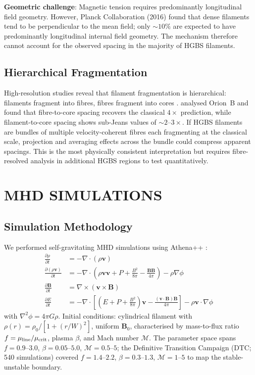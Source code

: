 \documentclass[twoside,twocolumn]{mnras}
\begin{document}
\textbf{Geometric challenge}: Magnetic tension requires predominantly longitudinal field
geometry. However, Planck Collaboration (2016) found that dense filaments tend to be
perpendicular to the mean field; only ${\sim}10\%$ are expected to have predominantly
longitudinal internal field geometry. The mechanism therefore cannot account for the
observed spacing in the majority of HGBS filaments.

\subsection{Hierarchical Fragmentation}

High-resolution studies reveal that filament fragmentation is hierarchical: filaments
fragment into fibres, fibres fragment into cores \citep{Hacar2013, Hacar2018}.
\citet{Yang2024} analysed Orion~B and found that fibre-to-core spacing recovers the
classical $4\times$ prediction, while filament-to-core spacing shows sub-Jeans values
of ${\sim}2$--$3\times$. If HGBS filaments are bundles of multiple velocity-coherent
fibres each fragmenting at the classical scale, projection and averaging effects across
the bundle could compress apparent spacings. This is the most physically consistent interpretation
but requires fibre-resolved analysis in additional HGBS regions to test quantitatively.

\section{MHD SIMULATIONS}

\subsection{Simulation Methodology}

We performed self-gravitating MHD simulations using Athena++ \citep{Stone2020}:
\begin{align}
\frac{\partial \rho}{\partial t} &= -\nabla \cdot (\rho \mathbf{v}) \\
\frac{\partial (\rho \mathbf{v})}{\partial t} &= -\nabla \cdot \left(\rho \mathbf{v} \mathbf{v} + P + \frac{B^2}{8\pi} - \frac{\mathbf{B}\mathbf{B}}{4\pi}\right) - \rho \nabla \phi \\
\frac{\partial \mathbf{B}}{\partial t} &= \nabla \times (\mathbf{v} \times \mathbf{B}) \\
\frac{\partial E}{\partial t} &= -\nabla \cdot \left[\left(E + P + \frac{B^2}{8\pi}\right)\mathbf{v} - \frac{(\mathbf{v} \cdot \mathbf{B})\mathbf{B}}{4\pi}\right] - \rho \mathbf{v} \cdot \nabla \phi
\end{align}
with $\nabla^2 \phi = 4\pi G\rho$. Initial conditions: cylindrical filament with
$\rho(r) = \rho_0 / [1 + (r/W)^2]$, uniform $\mathbf{B}_0$, characterised by
mass-to-flux ratio $f = \mu_{\rm line}/\mu_{\rm crit}$, plasma $\beta$, and
Mach number $\mathcal{M}$. The parameter space spans $f = 0.9$--$3.0$,
$\beta = 0.05$--$5.0$, $\mathcal{M} = 0.5$--$5$; the Definitive Transition Campaign
(DTC; 540 simulations) covered $f = 1.4$--$2.2$, $\beta = 0.3$--$1.3$,
$\mathcal{M} = 1$--$5$ to map the stable-unstable boundary.
\end{document}
